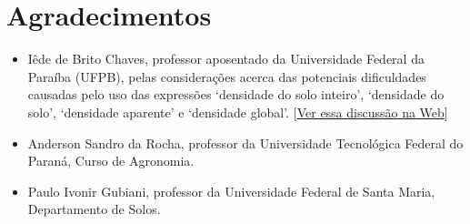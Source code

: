 \documentclass[
]{book}
\providecommand{\tightlist}{%
  \setlength{\itemsep}{0pt}\setlength{\parskip}{0pt}}
\begin{document}
\hypertarget{agradecimentos}{%
\section*{Agradecimentos}\label{agradecimentos}}

\begin{itemize}
\tightlist
\item
  Iêde de Brito Chaves, professor aposentado da Universidade Federal da Paraíba (UFPB), pelas considerações acerca das potenciais dificuldades causadas pelo uso das expressões `densidade do solo inteiro', `densidade do solo', `densidade aparente' e `densidade global'. {[}\href{https://groups.google.com/d/msgid/soil-mapping/7c8745ca-243d-4d15-97cc-2d00cb5eefdd\%40googlegroups.com}{Ver essa discussão na Web}{]}
\item
  Anderson Sandro da Rocha, professor da Universidade Tecnológica Federal do Paraná, Curso de Agronomia.
\item
  Paulo Ivonir Gubiani, professor da Universidade Federal de Santa Maria, Departamento de Solos.
\end{itemize}

  
\end{document}
